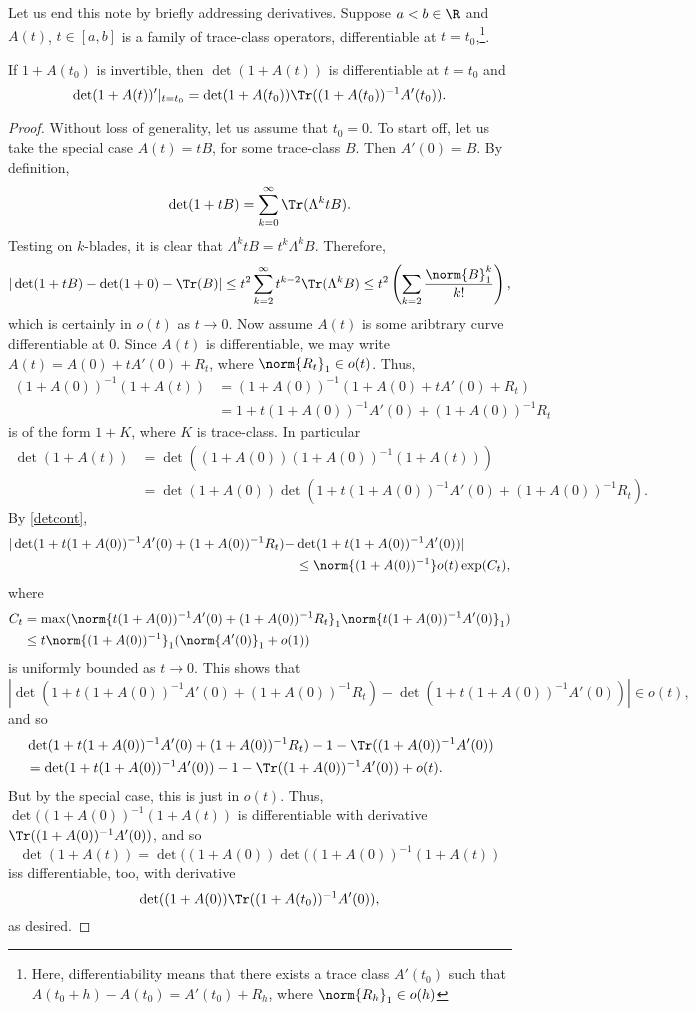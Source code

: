\documentclass[12pt]{amsart}
\begin{document}
Let us end this note by briefly addressing derivatives. Suppose $a<b \in \R$ and $A(t)$, $t \in [a,b]$ is a family of trace-class operators, differentiable at $t=t_0$,\footnote{Here, differentiability means that there exists a trace class $A'(t_0)$ such that $A(t_0+h)-A(t_0) = A'(t_0) + R_h$, where $\norm{R_h}_1 \in o(h)$}.
\begin{prop}If $1+A(t_0)$ is invertible, then $\det(1+A(t))$ is differentiable at $t=t_0$ and
\[\det(1+A(t))'|_{t = t_0} = \det(1+A(t_0))\Tr((1+A(t_0))^{-1}A'(t_0)).\]\end{prop}
\begin{proof}
Without loss of generality, let us assume that $t_0 = 0$. To start off, let us take the special case $A(t) = tB$, for some trace-class $B$. Then $A'(0) = B$. By definition,
\[\det(1+tB) = \sum_{k=0}^{\infty}\Tr(\Lambda^k tB).\]
Testing on $k$-blades, it is clear that $\Lambda^k tB = t^k\Lambda^k B$. Therefore,
\[|\det(1+tB)-\det(1+0)-\Tr(B)| \leq t^2\sum_{k=2}^{\infty}t^{k-2}\Tr(\Lambda^k B) \leq t^2\left(\sum_{k=2} \frac{\norm{B}_1^k}{k!}\right),\] which is certainly in $o(t)$ as $t \to 0$.
Now assume $A(t)$ is some aribtrary curve differentiable at $0$. Since $A(t)$ is differentiable, we may write $A(t) = A(0) + tA'(0) + R_t$, where $\norm{R_t}_1 \in o(t)$. Thus,
\begin{align*}
(1+A(0))^{-1}(1+A(t)) &=  (1+A(0))^{-1}(1+A(0) + tA'(0) + R_t)\\
&= 1 + t(1+A(0))^{-1}A'(0) + (1+A(0))^{-1}R_t\end{align*}
 is of the form $1+K$, where $K$ is trace-class. In particular
\begin{align*}\det(1+A(t)) &= \det((1+A(0))(1+A(0))^{-1}(1+A(t)))\\
&= \det(1+A(0))\det(1 + t(1+A(0))^{-1}A'(0) + (1+A(0))^{-1}R_t).\end{align*}
By \cref{detcont}, 
\begin{align*}
|\det(1 + t(1+A(0))^{-1}A'(0) + (1+A(0))^{-1}R_t) - &\det(1+t(1+A(0))^{-1}A'(0))|\\
&\leq \norm{(1+A(0))^{-1}}o(t)\exp(C_t),\end{align*}
where
\begin{align*}
C_t &= \max(\norm{t(1+A(0))^{-1}A'(0) + (1+A(0))^{-1}R_t}_1\norm{t(1+A(0))^{-1}A'(0)}_1)\\
&\leq t\norm{(1+A(0))^{-1}}_1(\norm{A'(0)}_1 + o(1))\end{align*}
is uniformly bounded as $t\to 0$.
This shows that \[|\det(1 + t(1+A(0))^{-1}A'(0) + (1+A(0))^{-1}R_t) - \det(1+t(1+A(0))^{-1}A'(0))| \in o(t),\] and so
\begin{align*}
&\det(1 + t(1+A(0))^{-1}A'(0) + (1+A(0))^{-1}R_t) -1 - \Tr((1+A(0))^{-1}A'(0))\\
&= \det(1+t(1+A(0))^{-1}A'(0)) - 1-\Tr((1+A(0))^{-1}A'(0)) + o(t).\end{align*}
But by the special case, this is just in $o(t)$. Thus,
$\det((1+A(0))^{-1}(1+A(t))$ is differentiable with derivative $\Tr((1+A(0))^{-1}A'(0))$, and so
\[\det(1+A(t)) = \det((1+A(0))\det((1+A(0))^{-1}(1+A(t))\] iss differentiable, too, with derivative
\[\det((1+A(0))\Tr((1+A(t_0))^{-1}A'(0)),\] as desired.\end{proof}
\end{document}
